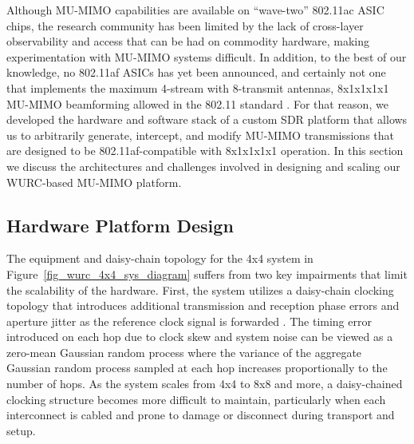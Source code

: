 	Although \ac{MU-MIMO} capabilities are available on ``wave-two'' 802.11ac \ac{ASIC} chips, the research community has been limited by the lack of cross-layer observability and access that can be had on commodity hardware, making experimentation with \ac{MU-MIMO} systems difficult.
 In addition, to the best of our knowledge, no 802.11af \acp{ASIC} has yet been announced, and certainly not one that implements the maximum 4-stream with 8-transmit antennas, 8x1x1x1x1 \ac{MU-MIMO} beamforming allowed in the 802.11 standard \cite{std11af}.
 For that reason, we developed the hardware and software stack of a custom \ac{SDR} platform that allows us to arbitrarily generate, intercept, and modify \ac{MU-MIMO} transmissions that are designed to be 802.11af-compatible with 8x1x1x1x1 operation.
	In this section we discuss the architectures and challenges involved in designing and scaling our \ac{WURC}-based \ac{MU-MIMO} platform.
	
\subsection{Hardware Platform Design}
\label{sec:wurc_argos_design}


	The equipment and daisy-chain topology for the 4x4 system in Figure~\ref{fig_wurc_4x4_sys_diagram} suffers from two key impairments that limit the scalability of the hardware.
	First, the system utilizes a daisy-chain clocking topology that introduces additional transmission and reception phase errors and aperture jitter as the reference clock signal is forwarded \cite{kester2008aperture}.
	The timing error introduced on each hop due to clock skew and system noise can be viewed as a zero-mean Gaussian random process where the variance of the aggregate Gaussian random process sampled at each hop increases proportionally to the number of hops.
	As the system scales from 4x4 to 8x8 and more, a daisy-chained clocking structure becomes more difficult to maintain, particularly when each interconnect is cabled and prone to damage or disconnect during transport and setup.
	
